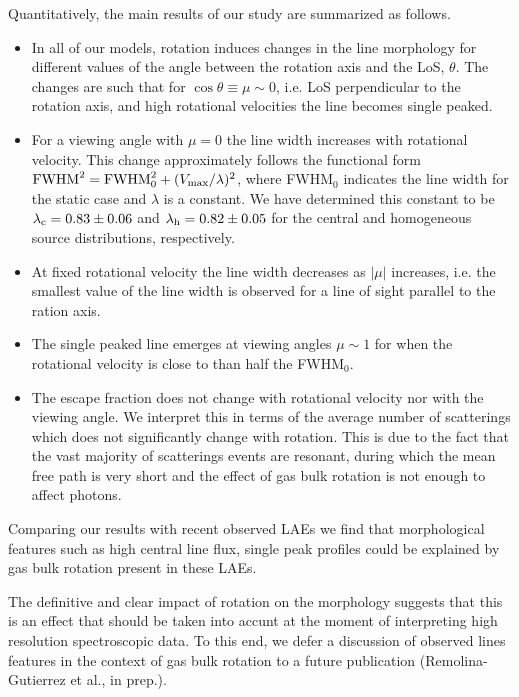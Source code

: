 \documentclass{emulateapj}
\newcommand{\ly}{{\ifmmode{{\rm Ly}\alpha~}\else{Ly$\alpha$~}\fi}}
\begin{document}
Quantitatively, the main results of our study are summarized as
follows. 

\begin{itemize}

\item In all of our models, rotation induces changes in the line morphology
 for different values of the angle between the rotation
 axis and the LoS, $\theta$.  The changes are such that for 
 $\cos\theta\equiv \mu\sim 0$, i.e. LoS perpendicular to the
 rotation axis, and high rotational velocities the line becomes single peaked.

\item For a viewing angle with $\mu=0$ the line width increases with rotational
  velocity. This change approximately follows the functional form  ${\rm FWHM}^2 = {\rm FWHM}_{ 0}^2 + (V_{\rm max}/\lambda)^2$, where FWHM$_{0}$ indicates the line
  width for the static case and $\lambda$ is a constant. We have
  determined this constant to be  $\lambda_{\rm c}=0.83 \pm 0.06$ and
  $\lambda_{\rm h}=0.82\pm 0.05$ for the central and homogeneous source
  distributions, respectively.

\item At fixed rotational velocity the line width decreases as $|\mu|$
  increases, i.e. the smallest value of the line width is observed for
  a line of sight parallel to the ration axis. 

\item The single peaked line emerges at viewing angles $\mu\sim 1$ for
  when the rotational velocity is close to than half the FWHM$_0$.

\item  The escape fraction does not change with rotational velocity
  nor with the viewing angle. We interpret this
  in terms of the average number of scatterings which does not
  significantly change with rotation. This is due to the  
  fact that the vast majority of scatterings events are resonant, 
  during which the mean free path is very short and the effect of gas
  bulk rotation is not enough to affect \ly photons. 

\end{itemize}

Comparing our results with recent observed LAEs we find that 
morphological features such as high central line flux, single peak
profiles  could be explained by gas bulk  rotation present in these
LAEs. 

The definitive and clear impact of rotation on the \ly morphology
suggests that this is an effect that should be taken into accunt at
the moment of interpreting high resolution spectroscopic data. To this
end, we defer a discussion of observed lines features in the context of gas
bulk rotation to a future publication (Remolina-Gutierrez et al., in
prep.).   
\end{document}
